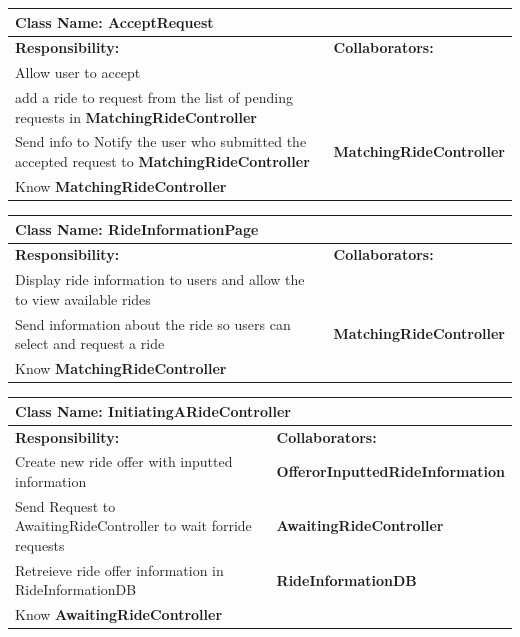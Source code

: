 \documentclass[]{article}
\begin{document}
\begin{table}[H]
    \centering
    \begin{tabular}{|p{5cm}|p{5cm}|}
    \hline
    \multicolumn{2}{|l|}{\textbf{Class Name:} AcceptRequest} \\
    \hline
    \textbf{Responsibility:} & \textbf{Collaborators:} \\
    \hline
    Allow user to accept &  \phantom{}\\
    add a ride to  request from the list of pending requests in \textbf{MatchingRideController} & \phantom{} \\
    \hline
    Send info to Notify the user who submitted the accepted request to \textbf{MatchingRideController} & \textbf{MatchingRideController}
    \\
    \hline
     Know \textbf{MatchingRideController}  & \phantom{} \\
    \hline
    
    \hline
    \end{tabular}
\end{table}


\begin{table}[H]
    \centering
    \begin{tabular}{|p{5cm}|p{5cm}|}
    \hline
    \multicolumn{2}{|l|}{\textbf{Class Name:} RideInformationPage} \\
    \hline
    \textbf{Responsibility:} & \textbf{Collaborators:} \\
    \hline
    Display ride information to users and allow the to view available rides & \phantom{} \\
    \hline
    Send information about the ride so users can select and request a ride & \textbf{MatchingRideController} \\
    \hline
     Know \textbf{MatchingRideController}  & \phantom{} \\
    \hline
    
   
    \end{tabular}
\end{table}


\begin{table}[H]
    \centering
    \begin{tabular}{|p{5cm}|p{5cm}|}
        \hline 
        \multicolumn{2}{|l|}{\textbf{Class Name:} InitiatingARideController} \\
        \hline
        \textbf{Responsibility:} & \textbf{Collaborators:} \\
        \hline
        Create new ride offer with inputted information & \textbf{OfferorInputtedRideInformation} \\
        \hline
        Send Request to AwaitingRideController to wait forride requests & \textbf{AwaitingRideController} \\
        \hline
        Retreieve ride offer information in RideInformationDB  & \textbf{RideInformationDB } \\
        \hline
         Know \textbf{AwaitingRideController}  & \phantom{} \\
    \hline
    \end{tabular}
\end{table}
\end{document}
